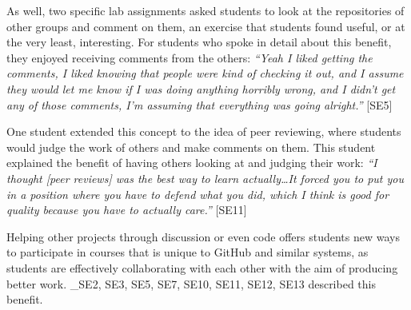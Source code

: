As well, two specific lab assignments asked students to look at the repositories of other groups and comment on them, an exercise that students found useful, or at the very least, interesting. For students who spoke in detail about this benefit, they enjoyed receiving comments from the others: \textit{``Yeah I liked getting the comments, I liked knowing that people were kind of checking it out, and I assume they would let me know if I was doing anything horribly wrong, and I didn't get any of those comments, I'm assuming that everything was going alright.''} [SE5]

One student extended this concept to the idea of peer reviewing, where students would judge the work of others and make comments on them. This student explained the benefit of having others looking at and judging their work: \textit{``I thought [peer reviews] was the best way to learn actually\ldots It forced you to put you in a position where you have to defend what you did, which I think is good for quality because you have to actually care.''} [SE11]

Helping other projects through discussion or even code offers students new ways to participate in courses that is unique to GitHub and similar systems, as students are effectively collaborating with each other with the aim of producing better work. _{SE2, SE3, SE5, SE7, SE10, SE11, SE12, SE13} described this benefit.



